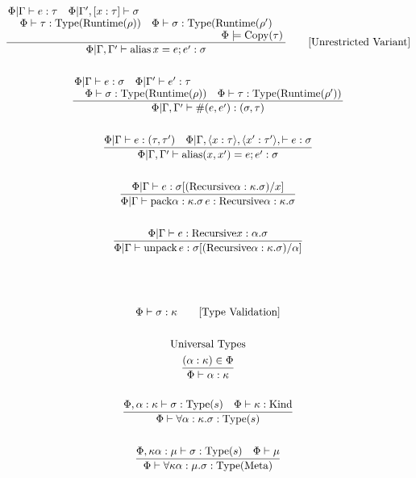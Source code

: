 \documentclass {article}
\begin{document}
\begin{gather*}
\\
\frac
{\splitfrac{ \Phi | \Gamma \vdash e : \tau \quad \Phi | \Gamma', [x : \tau] \vdash \sigma}
{\splitfrac{\Phi \vdash \tau : \text{Type}(\text{Runtime}(\rho)) \quad \Phi \vdash \sigma : \text{Type}(\text{Runtime}(\rho')}
{ \Phi \models \text{Copy}(\tau)}}}
{\Phi | \Gamma, \Gamma' \vdash \text{alias} \, x = e; e' : \sigma} \tag*{[Unrestricted Variant]}\\
\\
\frac
{\splitfrac{\Phi | \Gamma \vdash e : \sigma \quad \Phi | \Gamma' \vdash e' : \tau}
{\Phi \vdash \sigma : \text{Type}(\text{Runtime}(\rho)) \quad \Phi \vdash \tau : \text{Type}(\text{Runtime}(\rho')) }}
{\Phi | \Gamma, \Gamma' \vdash \#(e, e') : (\sigma, \tau) } \\
\\
\frac
{\Phi | \Gamma \vdash e : (\tau, \tau') \quad \Phi | \Gamma , \langle x : \tau \rangle, \langle x' : \tau' \rangle,  \vdash e : \sigma  }
{\Phi | \Gamma, \Gamma' \vdash \text{alias} (x, x') = e; e' : \sigma} \\
\\
\frac
{\Phi | \Gamma \vdash e :  \sigma [(\text{Recursive} \alpha : \kappa. \sigma ) /x] }
{\Phi | \Gamma \vdash \text{pack} \alpha : \kappa. \sigma  \, e : \text{Recursive} \alpha : \kappa. \sigma} \\
\\
\frac
{\Phi | \Gamma \vdash e : \text{Recursive} x : \alpha. \sigma }
{\Phi | \Gamma \vdash \text{unpack} \, e : \sigma [(\text{Recursive} \alpha : \kappa. \sigma ) /\alpha]} \\
\\
\\
\\
\Phi \vdash \sigma : \kappa \tag* {[\text{Type Validation}]} \\
\\
\text{Universal Types}
\\
\frac
{(\alpha : \kappa) \in \Phi}
{\Phi \vdash \alpha : \kappa} \\
\\
\frac
{\Phi, \alpha : \kappa \vdash \sigma : \text{Type}(s) \quad \Phi \vdash \kappa : \text{Kind}}
{\Phi \vdash \forall \alpha : \kappa. \sigma : \text{Type} (s) } \\
\\
\frac
{\Phi, \kappa \alpha : \mu \vdash \sigma : \text{Type} (s) \quad \Phi \vdash \mu  }
{\Phi \vdash \forall \kappa \alpha : \mu. \sigma : \text{Type} (\text{Meta}) } \\
\\

\end{gather*}
\end{document}
